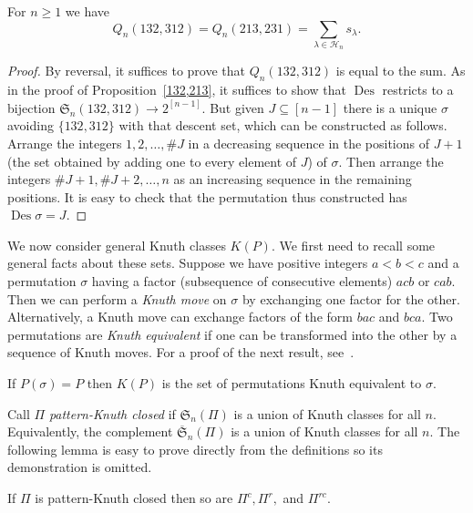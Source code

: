 \documentclass[ALCO,ThmDefs,Unicode,epreuves]{cedram}
\newcommand{\ofS}{\ol{\fS}}
\newcommand{\ol}{\overline}
\newcommand{\sbe}{\subseteq}
\newcommand{\ra}{\rightarrow}
\newcommand{\la}{\lambda}
\newcommand{\si}{\sigma}
\newcommand{\cH}{{\mathcal H}}
\newcommand{\fS}{{\mathfrak S}}
\DeclareMathOperator{\Des}{Des}
\begin{document}
\begin{prop} 
\label{132,312}
For $n\ge1$ we have
\[
Q_n(132,312)=Q_n(213,231)=\sum_{\la\in\cH_n} s_\la.
\]
\end{prop}
\begin{proof}
By reversal, it suffices to prove that $Q_n(132,312)$ is equal to the sum. As in the proof of Proposition~\ref{132,213}, it suffices to show that $\Des$ restricts to a bijection $\fS_n(132,312)\ra 2^{[n-1]}$. But given $J\sbe[n-1]$ there is a unique $\si$ avoiding $\{132,312\}$ with that descent set, which can be constructed as follows. Arrange the integers $1,2,\dots,\#J$ in a decreasing sequence in the positions of $J+1$ (the set obtained by adding one to every element of $J$) of $\si$. Then arrange the integers $\#J+1,\#J+2,\dots,n$ as an increasing sequence in the remaining positions. It is easy to check that the permutation thus constructed has $\Des\si=J$.
\end{proof}

We now consider general Knuth classes $K(P)$. We first need to recall some general facts about these sets. Suppose we have positive integers $a<b<c$ and a permutation $\si$ having a factor (subsequence of consecutive elements) $acb$ or $cab$. Then we can perform a \emph{Knuth move} on $\si$ by exchanging one factor for the other. Alternatively, a Knuth move can exchange factors of the form $bac$ and $bca$. Two permutations are \emph{Knuth equivalent} if one can be transformed into the other by a sequence of Knuth moves. For a proof of the next result, see~\cite{sag:sym}.
\begin{theo}
\label{Kequiv}
If $P(\si)=P$ then $K(P)$ is the set of permutations Knuth equivalent to $\si$. %
\end{theo}

Call $\Pi$ \emph{pattern-Knuth closed} if $\fS_n(\Pi)$ is a union of Knuth classes for all $n$. Equivalently, the complement $\ofS_n(\Pi)$ is a union of Knuth classes for all $n$. The following lemma is easy to prove directly from the definitions so its demonstration is omitted.
\begin{lemma}
\label{pkc:rc}
If $\Pi$ is pattern-Knuth closed then so are $\Pi^c, \Pi^r,$ and $\Pi^{rc}$. %
\end{lemma}
\end{document}
